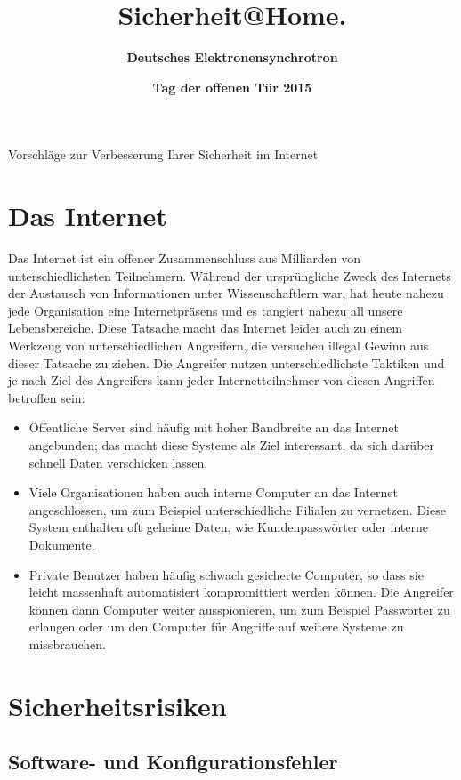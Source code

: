\documentclass[10pt,foldmark,tumble]{leaflet}
\title{\textcolor{DESYBlue}{\bf Sicherheit@Home}\textcolor{DESYOrange}{\bf.}}
\author{%
\Large \textcolor{DESYBlue}{\bf Deutsches Elektronensynchrotron}
}
\date{\textcolor{DESYOrange}{\bf Tag der offenen Tür 2015}}
\begin{document}
\maketitle

Vorschläge zur Verbesserung Ihrer Sicherheit im Internet

\newpage

\section{Das Internet}

Das Internet ist ein offener Zusammenschluss aus Milliarden von unterschiedlichsten
Teilnehmern. Während der ursprüngliche Zweck des Internets der Austausch von Informationen
unter Wissenschaftlern war, hat heute nahezu jede Organisation eine Internetpräsens und
es tangiert nahezu all unsere Lebensbereiche. Diese Tatsache macht das Internet leider auch
zu einem Werkzeug von unterschiedlichen Angreifern, die versuchen illegal Gewinn aus dieser
Tatsache zu ziehen.
Die Angreifer nutzen unterschiedlichste Taktiken und je nach Ziel des Angreifers kann jeder
Internetteilnehmer von diesen Angriffen betroffen sein:

\begin{itemize}
 \item Öffentliche Server sind häufig mit hoher Bandbreite an das Internet angebunden; das 
 macht diese Systeme als Ziel interessant, da sich darüber schnell Daten verschicken lassen.
 \item Viele Organisationen haben auch interne Computer an das Internet angeschlossen, um 
 zum Beispiel unterschiedliche Filialen zu vernetzen. Diese System enthalten oft geheime Daten, 
 wie Kundenpasswörter oder interne Dokumente.
 \item Private Benutzer haben häufig schwach gesicherte Computer, so dass sie leicht massenhaft
 automatisiert kompromittiert werden können. Die Angreifer können dann Computer weiter ausspionieren, 
 um zum Beispiel Passwörter zu erlangen oder um den Computer für Angriffe auf weitere Systeme 
 zu missbrauchen.
\end{itemize}

\section{Sicherheitsrisiken}

\subsection{Software- und Konfigurationsfehler}
\end{document}
